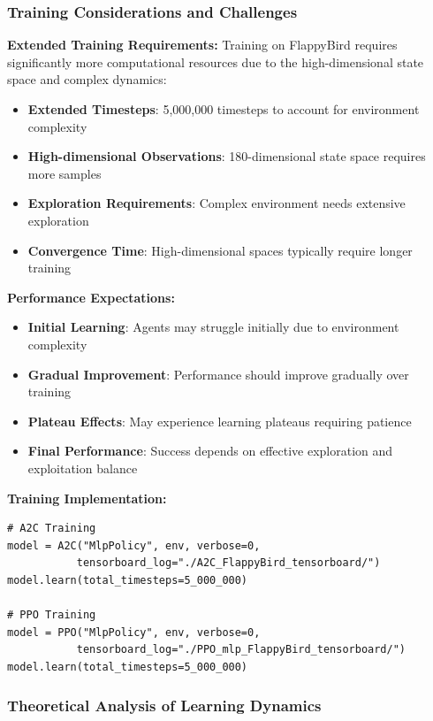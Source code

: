\documentclass[12pt]{article}
\begin{document}
{{{\subsubsection{Training Considerations and Challenges}

\textbf{Extended Training Requirements:}
Training on FlappyBird requires significantly more computational resources due to the high-dimensional state space and complex dynamics:

\begin{itemize}
    \item \textbf{Extended Timesteps}: 5,000,000 timesteps to account for environment complexity
    \item \textbf{High-dimensional Observations}: 180-dimensional state space requires more samples
    \item \textbf{Exploration Requirements}: Complex environment needs extensive exploration
    \item \textbf{Convergence Time}: High-dimensional spaces typically require longer training
\end{itemize}

\textbf{Performance Expectations:}
\begin{itemize}
    \item \textbf{Initial Learning}: Agents may struggle initially due to environment complexity
    \item \textbf{Gradual Improvement}: Performance should improve gradually over training
    \item \textbf{Plateau Effects}: May experience learning plateaus requiring patience
    \item \textbf{Final Performance}: Success depends on effective exploration and exploitation balance
\end{itemize}

\textbf{Training Implementation:}
\begin{verbatim}
# A2C Training
model = A2C("MlpPolicy", env, verbose=0, 
           tensorboard_log="./A2C_FlappyBird_tensorboard/")
model.learn(total_timesteps=5_000_000)

# PPO Training
model = PPO("MlpPolicy", env, verbose=0, 
           tensorboard_log="./PPO_mlp_FlappyBird_tensorboard/")
model.learn(total_timesteps=5_000_000)
\end{verbatim}

\subsubsection{Theoretical Analysis of Learning Dynamics}

}}}
\end{document}
